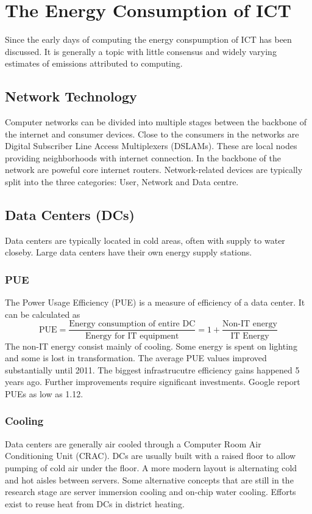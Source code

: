 \section{The Energy Consumption of ICT}
Since the early days of computing the energy conspumption of ICT has been discussed.
It is generally a topic with little consensus and widely varying estimates of emissions  attributed to computing.

\subsection{Network Technology}
Computer networks can be divided into multiple stages between the backbone of the internet and consumer devices.
Close to the consumers in the networks are Digital Subscriber Line Access Multiplexers (DSLAMs).
These are local nodes providing neighborhoods with internet connection.
In the backbone of the network are poweful core internet routers.
Network-related devices are typically split into the three categories: User, Network and Data centre.

\subsection{Data Centers (DCs)}
Data centers are typically located in cold areas, often with supply to water closeby.
Large data centers have their own energy supply stations.

\subsubsection{PUE}
The Power Usage Efficiency (PUE) is a measure of efficiency of a data center.
It can be calculated as
$$
\text{PUE} = \frac{\text{Energy consumption of entire DC}}{\text{Energy for IT equipment}}
= 1 + \frac{\text{Non-IT energy}}{\text{IT Energy}}
$$
The non-IT energy consist mainly of cooling.
Some energy is spent on lighting and some is lost in transformation.
The average PUE values improved substantially until 2011.
The biggest infrastrucutre efficiency gains happened 5 years ago.
Further improvements require significant investments.
Google report PUEs as low as 1.12.

\subsubsection{Cooling}
Data centers are generally air cooled through a Computer Room Air Conditioning Unit (CRAC).
DCs are usually built with a raised floor to allow pumping of cold air under the floor.
A more modern layout is alternating cold and hot aisles between servers.
Some alternative concepts that are still in the research stage are server immersion cooling and on-chip water cooling.
Efforts exist to reuse heat from DCs in district heating.

